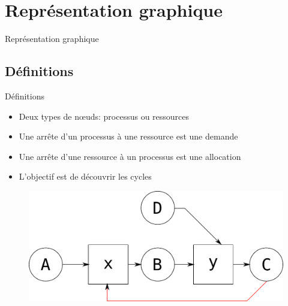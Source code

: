 \def\sectitle{Représentation graphique}
\section{\sectitle}
\begin{frame}{\sectitle}
    \def\subsectitle{Définitions}
    \subsection{\subsectitle}
    \begin{block}{\subsectitle}
        \begin{itemize}
            \item Deux types de n{\oe}uds: processus ou ressources
            \item Une arrête d'un processus à une ressource est une demande
            \item Une arrête d'une ressource à un processus est une allocation
            \item L'objectif est de découvrir les cycles
        \end{itemize}
    \end{block}

    \begin{figure}
        \includegraphics[width=.8\textwidth]{images/deadlockGraph01.pdf}
    \end{figure}

\end{frame}

